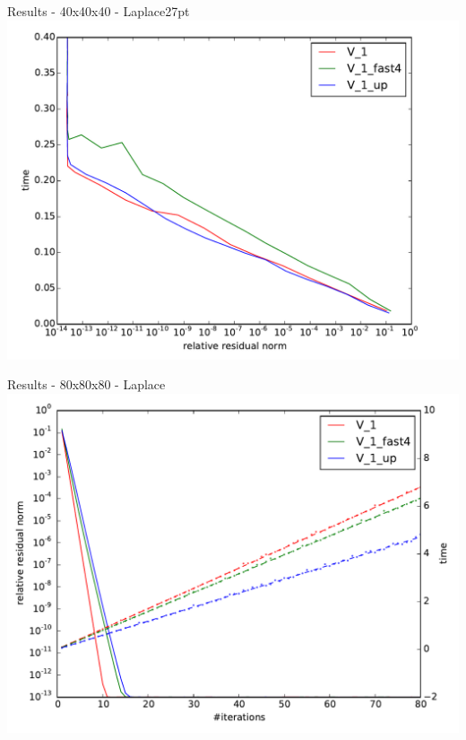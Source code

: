 \documentclass{beamer}
\begin{document}
\begin{frame}{Results - 40x40x40 - Laplace27pt}
 \includegraphics[width=\linewidth]{AMG2006/test/DELL/27pt/time_convergence_fast.pdf}
\end{frame}
\begin{frame}{Results - 80x80x80 - Laplace}
 \includegraphics[width=\linewidth]{AMG2006/test/DELL/laplace/convergence_fast.pdf}
\end{frame}
\end{document}
